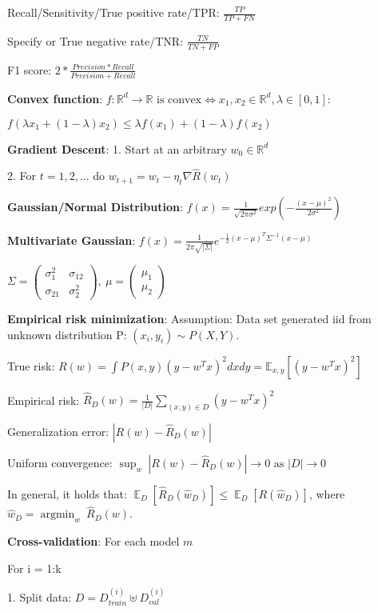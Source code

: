 Recall/Sensitivity/True positive rate/TPR: $\frac{TP}{TP + FN}$

Specify or True negative rate/TNR: $\frac{TN}{TN + FP}$

F1 score: $2* \frac{Precision \ast Recall}{Precision + Recall}$

\textbf{Convex function}: $f : \mathbb{R}^d \rightarrow \mathbb{R} \text{ is convex} \Leftrightarrow x_1,x_2 \in \mathbb{R}^d, \lambda \in [0,1]:$

$f(\lambda x_1 + (1-\lambda) x_2) \leq \lambda f(x_1) + (1-\lambda) f(x_2)$

\textbf{Gradient Descent}: 1. Start at an arbitrary $w_0 \in \mathbb{R}^d$

2. For $t = 1,2,...$ do $w_{t+1} = w_t - \eta_t \nabla \hat{R}(w_t)$

\textbf{Gaussian/Normal Distribution}:
$f(x) = \frac{1}{\sqrt{2\pi\sigma^2}} exp(-\frac{(x-\mu)^2}{2\sigma^2})$

\textbf{Multivariate Gaussian}: $f(x) = \frac{1}{2\pi \sqrt{|\Sigma|}} e^{- \frac{1}{2} (x-\mu)^T \Sigma^{-1} (x-\mu)}$

$\Sigma =
\begin{pmatrix} 
\sigma_1^2 & \sigma_{12} \\
\sigma_{21} & \sigma_2^2
\end{pmatrix},\ 
\mu = 
\begin{pmatrix} 
\mu_1\\
\mu_2
\end{pmatrix}$

\textbf{Empirical risk minimization}: Assumption: Data set generated iid from unknown distribution P: $(x_i , y_i) \sim P(X, Y).$

True risk: $R(w) = \int P(x,y) (y-w^Tx)^2 dx dy = \mathbb{E}_{x,y}[(y-w^Tx)^2]$

Empirical risk: $\hat{R}_D(w) = \frac{1}{|D|}\sum_{(x,y)\in D} (y-w^Tx)^2$

Generalization error: $|R(w) - \hat{R}_D(w)|$

Uniform convergence: $\operatorname{sup}_w\  |R(w) - \hat{R}_D(w)| \rightarrow 0 \text{ as } |D| \rightarrow 0$

In general, it holds that: $\mathop{\mathbb{E}}_D[\hat{R}_D(\hat{w}_D)] \leq \mathop{\mathbb{E}}_D[R(\hat{w}_D)]$, where $\hat{w}_D =  \operatorname{argmin}_w\ \hat{R}_D(w)$.

\textbf{Cross-validation}: For each model $m$

For i = 1:k

1. Split data: $D = D_{train}^{(i)} \uplus D_{val}^{(i)}$

